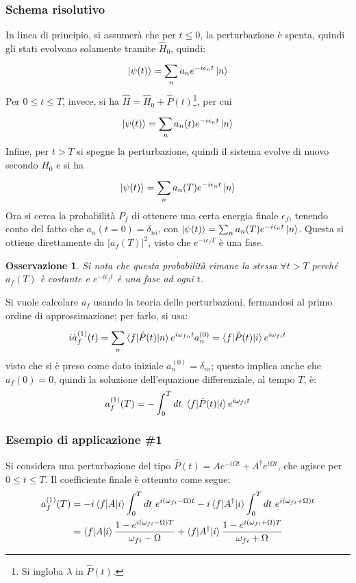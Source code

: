 \documentclass[11pt, a4paper]{scrartcl} %
\numberwithin{equation}{subsection}
\theoremstyle{style2}
\newtheorem{osservazione}{Osservazione}[section]
\theoremstyle{style1}
\begin{document}
\subsubsection{Schema risolutivo}
In linea di principio, si assumer\`a che per $t\le 0$, la perturbazione \`e spenta, quindi gli stati evolvono solamente tramite $\hat{H}_0$, quindi:
\[
\ket{\psi (t)}  = \sum_{n}^{} a_n e^{-i \epsilon _n t } \ket{n} 
\] 
Per $0\le t \le T$, invece, si ha $\hat{H} = \hat{H}_0 + \hat{P}(t)$\footnote{Si ingloba $\lambda $ in $\hat{P}(t)$.}, per cui 
\[
\ket{\psi (t)} = \sum_{n}^{} a_n(t) e^{-i\epsilon _n t}  \ket{n} 
\] 
Infine, per $t > T$ si spegne la perturbazione, quindi il sistema evolve di nuovo secondo $\hat{H}_0$ e si ha
\[
\ket{\psi (t)} = \sum_{n}^{} a_n(T) e^{-i \epsilon _n t} \ket{n} 
\] 
Ora si cerca la probabilit\`a $P_f$ di ottenere una certa energia finale $\epsilon _f $, tenendo conto del fatto che $a_n(t=0) = \delta _{ni} $, con $\ket{\psi (t)} = \sum_{n}^{}a_n(T) e^{-i\epsilon _n t}  \ket{n} $.
Questa si ottiene direttamente da $\lvert a_f(T) \rvert ^2$, visto che $e^{-i \epsilon _f T} $ \`e una fase.
\begin{osservazione}
Si nota che questa probabilit\`a rimane la stessa $\forall t > T$ perch\'e $a_f(T)$ \`e costante e $e^{- i \epsilon _f t} $ \`e una fase ad ogni $t$.
\end{osservazione}
Si vuole calcolare $a_f$ usando la teoria delle perturbazioni, fermandosi al primo ordine di approssimazione; per farlo, si usa:
\[
i \dot{a}^{(1)} _f (t)= \sum_{n}^{} \braket{f|\hat{P}(t)|n} e^{i \omega_{fn} t} a_n^{(0)} = \braket{f|\hat{P}(t)|i} e^{i \omega_{fi} t} 
\] 
visto che si \`e preso come dato iniziale $a_n^{(0)} =\delta _{ni} $; questo implica anche che $a_f(0) = 0$, quindi la soluzione dell'equazione differenziale, al tempo $T$, \`e:
\begin{equation}
	a^{(1)} _f (T) = - \int_{0} ^T dt \ \braket{f|\hat{P}(t)|i} e^{i\omega_{fi} t} 
\end{equation}
\subsubsection{Esempio di applicazione \#1}
Si considera una perturbazione del tipo $\hat{P}(t) = Ae^{-i\Omega t} + A^\dagger e^{i\Omega t} $, che agisce per $0\le t \le T$.
Il coefficiente finale \`e ottenuto come segue:
\[
\begin{split}
	a_f^{(1)} (T) &= - i \braket{f|A|i} \int_{0} ^T dt \ e^{i(\omega_{fi} - \Omega ) t} - i \braket{f|A^\dagger |i} \int_{0} ^T dt \ e^{i (\omega_{fi} + \Omega ) t} \\
		      &= \braket{f|A|i} \frac{1 - e ^{i(\omega_{fi} - \Omega ) T} }{\omega_{fi} -\Omega } + \braket{f|A^\dagger |i} \frac{1-e^{i(\omega_{fi} +\Omega ) T} }{\omega_{fi} +\Omega }
\end{split}
\] 
\end{document}
